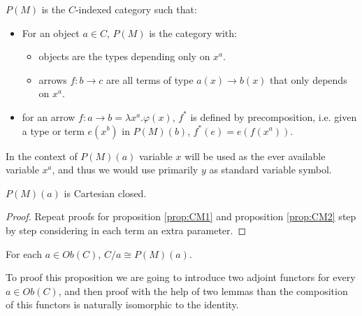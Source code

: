 \begin{definition} $P(M)$ is the $C$-indexed category such that:
  \begin{itemize}
  \item For an object $a\in C$, $P(M)$ is the category with:
    \begin{itemize}
    \item objects are the types depending only on $x^a$.
    \item arrows $f: b\to c$ are all terms of type $a(x)\to b(x)$ that only depends on $x^a$.
    \end{itemize}
  \item for an arrow $f:a\to b = \lambda x^a.\varphi(x)$, $f^*$ is defined by precomposition, i.e. given a type or term $e(x^b)$ in $P(M)(b)$, $f^*(e) = e(f(x^a))$.  
  \end{itemize}
\end{definition}

\begin{remark}
  In the context of $P(M)(a)$ variable $x$ will be used as the ever available variable $x^a$, and thus we would use primarily $y$ as standard variable symbol.
\end{remark}
\begin{proposition}
  $P(M)(a)$ is Cartesian closed.
\end{proposition}
\begin{proof}
  Repeat proofs for proposition \ref{prop:CM1} and proposition \ref{prop:CM2} step by step considering in each term an extra parameter.
\end{proof}


\begin{proposition}\label{lemma:hyperdoc}
  For each $a\in Ob(C)$, $C/a\cong P(M)(a)$.
\end{proposition}

To proof this proposition we are going to introduce two adjoint functors for every $a\in Ob(C)$, and then proof with the help of two lemmas than the composition of this functors is naturally isomorphic to the identity.

